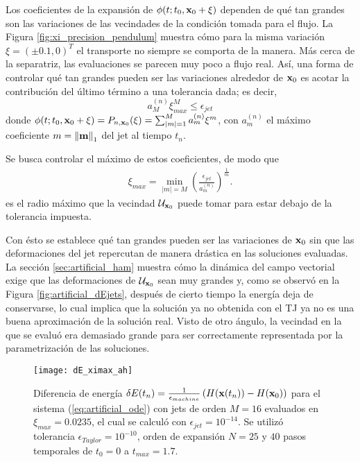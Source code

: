 Los coeficientes de la expansión de $\phi(t;t_0,\mathbf{x}_0 + \xi)$ dependen de qué tan grandes son las variaciones de las vecindades de la condición tomada para el flujo. La Figura \ref{fig:xi_precision_pendulum} muestra cómo para la misma variación $\xi = (\pm 0.1, 0)^T$ el transporte no siempre se comporta de la manera. Más cerca de la separatriz, las evaluaciones se parecen muy poco a flujo real. Así, una forma de controlar qué tan grandes pueden ser las variaciones alrededor de $\mathbf{x}_0$ es acotar la contribución del último término a una tolerancia dada; es decir,
\begin{equation*}
 a_{M}^{(n)}\xi_{max}^M \leq \epsilon_{jet}
\end{equation*}
donde $\phi(t;t_0,\mathbf{x}_0 + \xi) = P_{n,\mathbf{x}_0}(\xi) = \sum_{|m|=1}^M  a_{m}^{(n)} \xi^m$, con $a_{m}^{(n)}$ el máximo coeficiente $m = \left\lVert\mathbf{m}\right\rVert_1$ del jet al tiempo $t_n$.

Se busca controlar el máximo de estos coeficientes, de modo que 
\begin{align}
 \xi_{max} = \min_{|m|=M} \left( \frac{\epsilon_{jet}}{a_{m}^{(n)}} \right)^{\frac{1}{m}}.
 \label{eq:ximax}
\end{align}
es el radio máximo que la vecindad $\mathcal{U}_{\mathbf{x}_0}$ puede tomar para estar debajo de la tolerancia impuesta. 

Con ésto se establece qué tan grandes pueden ser las variaciones de $\mathbf{x}_0$ sin que las deformaciones del jet repercutan de manera drástica en las soluciones evaluadas. La sección \ref{sec:artificial_ham} muestra cómo la dinámica del campo vectorial exige que las deformaciones de $\mathcal{U}_{\mathbf{x}_0}$ sean muy grandes y, como se observó en la Figura \ref{fig:artificial_dEjets}, después de cierto tiempo la energía deja de conservarse, lo cual implica que la solución ya no obtenida con el TJ ya no es una buena aproximación de la solución real. Visto de otro ángulo, la vecindad en la que se evaluó era demasiado grande para ser correctamente representada por la parametrización de las soluciones.

\begin{figure}[h!]
	\centering
	\texttt{[image: dE\_ximax\_ah]}
	\caption{Diferencia de energía $\delta E(t_n) = \frac{1}{\epsilon_{machine}} \left( H(\mathbf{x}(t_n)) - H(\mathbf{x}_0) \right)$ para el sistema (\ref{eq:artificial_ode}) con jets de orden $M=16$ evaluados en $\xi_{max} = 0.0235$, el cual se calculó con $\epsilon_{jet} = 10^{-14}$. Se utilizó tolerancia $\epsilon_{Taylor} = 10^{-10}$, orden de expansión $N = 25$ y $40$ pasos temporales de $t_0 = 0$ a $t_{max} = 1.7$.}
	\label{fig:dE_ximax_ah}
\end{figure}

